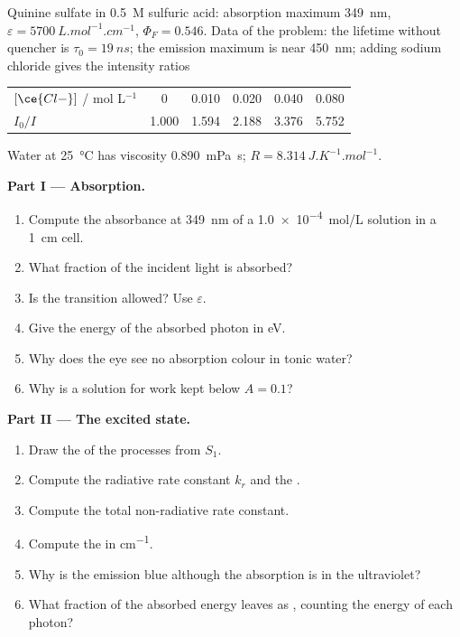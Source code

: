 \begin{problem}
\label{pb:b3:electronic-spectroscopy:1}
Quinine sulfate in \qty{0.5}{M} sulfuric acid: absorption maximum \qty{349}{nm},
$\varepsilon = \qty{5700}{L.mol^{-1}.cm^{-1}}$, $\Phi_F = 0.546$. Data of the problem: the
 lifetime without quencher is $\tau_0 = \qty{19}{ns}$; the emission
maximum is near \qty{450}{nm}; adding sodium chloride gives the intensity ratios
\begin{center}\small
\begin{tabular}{lccccc}
\hline
$[\ce{Cl-}]$ / mol L$^{-1}$ & 0 & 0.010 & 0.020 & 0.040 & 0.080 \\
$I_0/I$ & 1.000 & 1.594 & 2.188 & 3.376 & 5.752 \\ \hline
\end{tabular}
\end{center}
Water at \qty{25}{\celsius} has viscosity \qty{0.890}{mPa.s}; $R =
\qty{8.314}{J.K^{-1}.mol^{-1}}$.

\medskip\noindent\textbf{Part I --- Absorption.}
\begin{enumerate}
  \item Compute the absorbance at \qty{349}{nm} of a \qty{1.0e-4}{mol/L} solution in a
        \qty{1}{cm} cell.
  \item What fraction of the incident light is absorbed?
  \item Is the transition allowed? Use $\varepsilon$.
  \item Give the energy of the absorbed photon in eV.
  \item Why does the eye see no absorption colour in tonic water?
  \item Why is a solution for  work kept below $A = 0.1$?
\end{enumerate}

\medskip\noindent\textbf{Part II --- The excited state.}
\begin{enumerate}[resume]
  \item Draw the  of the processes from $S_1$.
  \item Compute the radiative rate constant $k_r$ and the .
  \item Compute the total non-radiative rate constant.
  \item Compute the  in \unit{cm^{-1}}.
  \item Why is the emission blue although the absorption is in the ultraviolet?
  \item What fraction of the absorbed energy leaves as , counting
        the energy of each photon?
\end{enumerate}


\end{problem}
